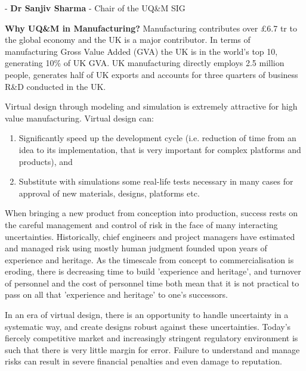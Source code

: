 \documentclass[11pt]{article}%
\begin{document}
\begin{minipage}[t]{.99\linewidth}
\begin{multicols}{2}
\begin{mdframed}[style=about,frametitle={}, leftmargin=20pt, rightmargin=20pt]
- {\bf Dr Sanjiv Sharma} - Chair of the UQ\&M SIG

\BackToContents %
\end{mdframed}\hfill

\vspace{25pt}
{\bf Why UQ\&M in Manufacturing?}
Manufacturing contributes over £6.7 tr to the global economy and the UK is a major contributor. In terms of manufacturing Gross Value Added (GVA) the UK is in the world's top 10, generating 10\% of UK GVA. UK manufacturing directly employs 2.5 million people, generates half of UK exports and accounts for three quarters of business R\&D conducted in the UK.

Virtual design through modeling and simulation is extremely attractive for high value manufacturing. Virtual design can:
\begin{enumerate}
    \item Significantly speed up the development cycle (i.e. reduction of time from an idea to its implementation, that is very important for complex platforms and products), and
    \item Substitute with simulations some real-life tests necessary in many cases for approval of new materials, designs, platforms etc.
\end{enumerate}
When bringing a new product from conception into production, success rests on the careful management and control of risk in the face of many interacting uncertainties. Historically, chief engineers and project managers have estimated and managed risk using mostly human judgment founded upon years of experience and heritage. As the timescale from concept to commercialisation is eroding, there is decreasing time to build 'experience and heritage', and turnover of personnel and the cost of personnel time both mean that it is not practical to pass on all that 'experience and heritage' to one's successors.

In an era of virtual design, there is an opportunity to handle uncertainty in a systematic way, and create designs robust against these uncertainties. Today's fiercely competitive market and increasingly stringent regulatory environment is such that there is very little margin for error. Failure to understand and manage risks can result in severe financial penalties and even damage to reputation.



\end{multicols}
\end{minipage}
\end{document}
